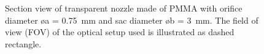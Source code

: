 \documentclass[letterpaper,twocolumn,10pt]{ilass}
\begin{document}
\begin{figure}[h]
\begin{center}
\end{center}
\vspace*{-10mm}
\caption{Section view of transparent nozzle made of PMMA with orifice diameter
         \o a = 0.75~mm and sac diameter \o b = 3~mm. The field of view (FOV)
				 of the optical setup used is illustrated as dashed rectangle.}
\label{fig3} 
\end{figure}
\end{document}
